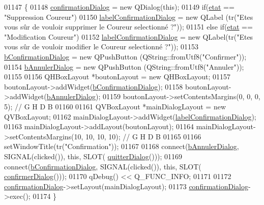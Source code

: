 \begin{DoxyCode}
01147 \{
01148     \hyperlink{class_i_h_m_gestion_cross_a417b63ff11c3be6623d17718d9058768}{confirmationDialog} = \textcolor{keyword}{new} QDialog(\textcolor{keyword}{this});
01149     \textcolor{keywordflow}{if}(\hyperlink{class_i_h_m_gestion_cross_a5da4390d71dbd5d05cff339f93c7c85a}{etat} == \textcolor{stringliteral}{"Suppression Coureur"})
01150         \hyperlink{class_i_h_m_gestion_cross_a9b51d06493979981248ecc2641f82be4}{labelConfirmationDialog} = \textcolor{keyword}{new} QLabel (tr(\textcolor{stringliteral}{"Etes vous sûr de vouloir supprimer
       le Coureur selectionné ?"}));
01151     \textcolor{keywordflow}{else} \textcolor{keywordflow}{if}(\hyperlink{class_i_h_m_gestion_cross_a5da4390d71dbd5d05cff339f93c7c85a}{etat} == \textcolor{stringliteral}{"Modification Coureur"})
01152         \hyperlink{class_i_h_m_gestion_cross_a9b51d06493979981248ecc2641f82be4}{labelConfirmationDialog} = \textcolor{keyword}{new} QLabel(tr(\textcolor{stringliteral}{"Etes vous sûr de vouloir modifier
       le Coureur selectionné ?"}));
01153     \hyperlink{class_i_h_m_gestion_cross_a8aaf51ea455654df21f65ed496384b60}{bConfirmationDialog} = \textcolor{keyword}{new} QPushButton (QString::fromUtf8(\textcolor{stringliteral}{"Confirmer"}));
01154     \hyperlink{class_i_h_m_gestion_cross_a2efd604a10cae21b2f85e7196c3927fd}{bAnnulerDialog} = \textcolor{keyword}{new} QPushButton (QString::fromUtf8(\textcolor{stringliteral}{"Annuler"}));
01155 
01156     QHBoxLayout *boutonLayout = \textcolor{keyword}{new} QHBoxLayout;
01157     boutonLayout->addWidget(\hyperlink{class_i_h_m_gestion_cross_a8aaf51ea455654df21f65ed496384b60}{bConfirmationDialog});
01158     boutonLayout->addWidget(\hyperlink{class_i_h_m_gestion_cross_a2efd604a10cae21b2f85e7196c3927fd}{bAnnulerDialog});
01159     boutonLayout->setContentsMargins(0, 0, 0, 5); \textcolor{comment}{// G H D B}
01160 
01161     QVBoxLayout *mainDialogLayout = \textcolor{keyword}{new} QVBoxLayout;
01162     mainDialogLayout->addWidget(\hyperlink{class_i_h_m_gestion_cross_a9b51d06493979981248ecc2641f82be4}{labelConfirmationDialog});
01163     mainDialogLayout->addLayout(boutonLayout);
01164     mainDialogLayout->setContentsMargins(10, 10, 10, 10); \textcolor{comment}{// G H D B}
01165 
01166     setWindowTitle(tr(\textcolor{stringliteral}{"Confirmation"}));
01167 
01168     connect(\hyperlink{class_i_h_m_gestion_cross_a2efd604a10cae21b2f85e7196c3927fd}{bAnnulerDialog}, SIGNAL(clicked()), \textcolor{keyword}{this}, SLOT(
      \hyperlink{class_i_h_m_gestion_cross_a58b19fa84a16060a3dd951abeba2c543}{quitterDialog}()));
01169     connect(\hyperlink{class_i_h_m_gestion_cross_a8aaf51ea455654df21f65ed496384b60}{bConfirmationDialog}, SIGNAL(clicked()), \textcolor{keyword}{this}, SLOT(
      \hyperlink{class_i_h_m_gestion_cross_a144933ab31ae263be7267b93bfd53a82}{confirmerDialog}()));
01170     qDebug() << Q\_FUNC\_INFO;
01171 
01172     \hyperlink{class_i_h_m_gestion_cross_a417b63ff11c3be6623d17718d9058768}{confirmationDialog}->setLayout(mainDialogLayout);
01173     \hyperlink{class_i_h_m_gestion_cross_a417b63ff11c3be6623d17718d9058768}{confirmationDialog}->exec();
01174 \}
\end{DoxyCode}
